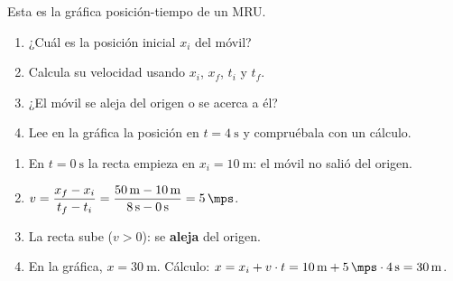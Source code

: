\begin{exercise}
    Esta es la gráfica posición-tiempo de un MRU.
    \begin{center}
    \end{center}
    \begin{enumerate}[label=\letraminuscula]
        \item ¿Cuál es la posición inicial \(x_i\) del móvil?
        \item Calcula su velocidad usando \(x_i\), \(x_f\), \(t_i\) y \(t_f\).
        \item ¿El móvil se aleja del origen o se acerca a él?
        \item Lee en la gráfica la posición en \(t = \qty{4}{\s}\) y compruébala con un cálculo.
    \end{enumerate}
    \begin{solu}
        \begin{enumerate}[label=\alph*)]
            \item En \(t = \qty{0}{\s}\) la recta empieza en \(x_i = \qty{10}{\m}\): el móvil no salió del origen.
            \item \(v = \dfrac{x_f - x_i}{t_f - t_i} = \dfrac{\qty{50}{\m} - \qty{10}{\m}}{\qty{8}{\s} - \qty{0}{\s}} = \qty{5}{\mps}\).
            \item La recta sube (\(v > 0\)): se \textbf{aleja} del origen.
            \item En la gráfica, \(x = \qty{30}{\m}\). Cálculo: \(x = x_i + v \cdot t = \qty{10}{\m} + \qty{5}{\mps} \cdot \qty{4}{\s} = \qty{30}{\m}\).
        \end{enumerate}
    \end{solu}
\end{exercise}

